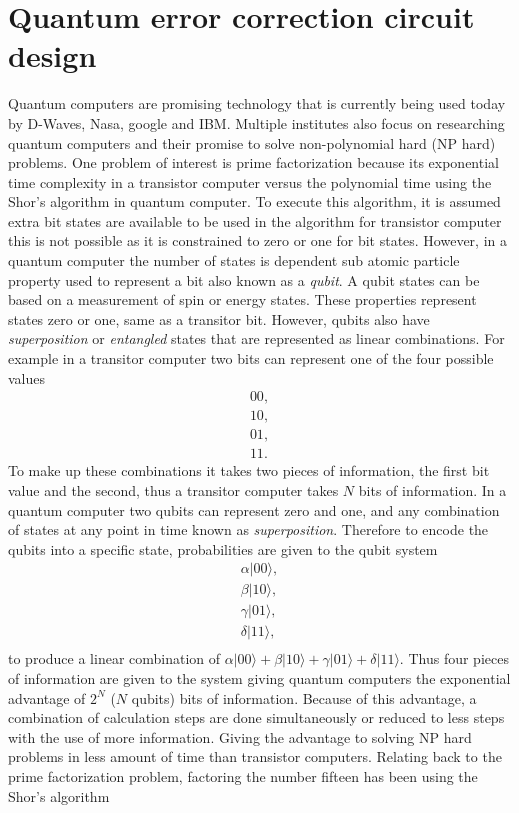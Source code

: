 \section{Quantum error correction circuit design}
\label{Qubit}
Quantum computers are promising technology that is currently being used today by D-Waves, Nasa, google and IBM. Multiple institutes also focus on researching quantum computers and their promise to solve non-polynomial hard (NP hard) problems. One problem of interest is prime factorization because its exponential time complexity in a transistor computer versus the polynomial time using the Shor's algorithm in quantum computer. To execute this algorithm, it is assumed extra bit states are
available to be used in the algorithm for transistor computer this is not possible as it is constrained to zero or one for bit states. However, in a quantum computer the number of states is dependent sub atomic particle property used to represent a bit also known as a \textit{qubit}. A qubit states can be based on a measurement of spin or energy states. These properties represent states zero or one, same as a
transitor bit. However, qubits also have \textit{superposition} or \textit{entangled} states that are represented as linear combinations. For example in a transitor computer two bits can represent one of the four possible values
\begin{align*}
    00,\\
    10,\\
    01,\\
    11.
\end{align*}
To make up these combinations it takes two pieces of information, the first bit value and the second, thus a transitor computer takes $N$ bits of information. In a quantum computer two qubits can represent zero and one, and any combination of states at any point in time known as \textit{superposition}. Therefore to encode the qubits into a specific state, probabilities are
given to the qubit system 
\begin{align*}
    \alpha |00 \rangle,\\
    \beta  |10 \rangle,\\
    \gamma |01 \rangle,\\
    \delta |11 \rangle,\\
\end{align*}
to produce a linear combination of $\alpha |00 \rangle + \beta  |10 \rangle + \gamma |01 \rangle + \delta |11 \rangle.$
Thus four pieces of information are given to the system giving quantum computers the exponential advantage of $2^N$ ($N$ qubits) bits of information. Because of this advantage, a combination of calculation steps are done simultaneously or reduced to less steps with the use of more information. Giving the advantage to solving NP hard problems in less amount of time than transistor computers. Relating back to the prime factorization problem, factoring the number fifteen has been using the Shor's algorithm
